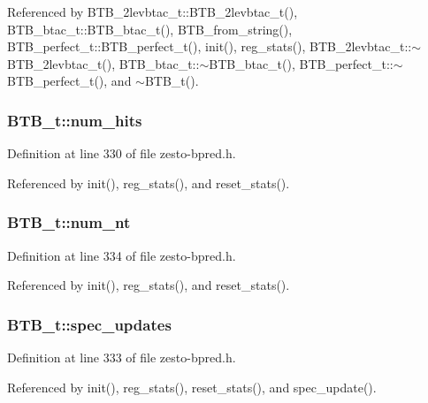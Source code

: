 Referenced by BTB\_\-2levbtac\_\-t::BTB\_\-2levbtac\_\-t(), BTB\_\-btac\_\-t::BTB\_\-btac\_\-t(), BTB\_\-from\_\-string(), BTB\_\-perfect\_\-t::BTB\_\-perfect\_\-t(), init(), reg\_\-stats(), BTB\_\-2levbtac\_\-t::$\sim$BTB\_\-2levbtac\_\-t(), BTB\_\-btac\_\-t::$\sim$BTB\_\-btac\_\-t(), BTB\_\-perfect\_\-t::$\sim$BTB\_\-perfect\_\-t(), and $\sim$BTB\_\-t().
\subsubsection[{num\_\-hits}]{ {\bf BTB\_\-t::num\_\-hits}\hspace{0.3cm}{\tt  [protected]}}\label{classBTB__t_58cb344c2870517900223cd1d1f59a20}




Definition at line 330 of file zesto-bpred.h.

Referenced by init(), reg\_\-stats(), and reset\_\-stats().
\subsubsection[{num\_\-nt}]{ {\bf BTB\_\-t::num\_\-nt}\hspace{0.3cm}{\tt  [protected]}}\label{classBTB__t_07a06f83ab8c0c494415ec99795d761c}




Definition at line 334 of file zesto-bpred.h.

Referenced by init(), reg\_\-stats(), and reset\_\-stats().
\subsubsection[{spec\_\-updates}]{ {\bf BTB\_\-t::spec\_\-updates}\hspace{0.3cm}{\tt  [protected]}}\label{classBTB__t_c17c0bf4e6618c7124dc99eb0b9875cb}




Definition at line 333 of file zesto-bpred.h.

Referenced by init(), reg\_\-stats(), reset\_\-stats(), and spec\_\-update().
